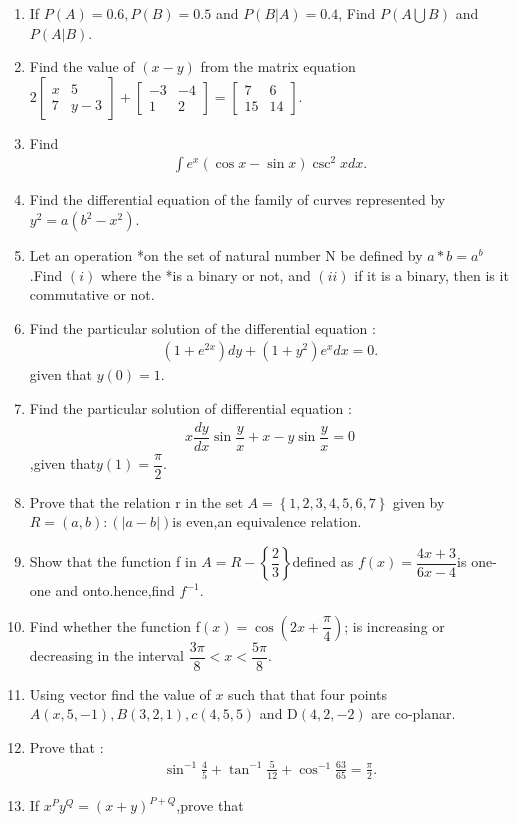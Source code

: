 \documentclass[12pt,-letter paper]{article}
\providecommand{\myvec}[1]{\ensuremath{\begin{bmatrix}#1\end{bmatrix}}}
\providecommand{\cbrak}[1]{\ensuremath{\left\{#1\right\}}}
\providecommand{\brak}[1]{\ensuremath{\left(#1\right)}}
\providecommand{\abs}[1]{\left\vert#1\right\vert}
\begin{document}
\begin{enumerate}
\item If $P\brak{A}=0.6,P\brak{B}=0.5$ and $P\brak{B|A}=0.4$, Find $P\brak{A\bigcup B}$ and $P\brak{A|B}$.
\item Find the value of $\brak{x-y}$ from the matrix equation $2\myvec{x&5\\7&y-3}+\myvec{-3&-4\\1&2}=\myvec{7&6\\15&14}.$
\item Find
\begin{align}
\int e^x\brak{\cos x-\sin x}\csc^2 x dx.
\end{align}
\item Find the differential equation of the family of curves represented by $y^2=a\brak{b^2-x^2}$.
\item Let an operation *on the set of natural number N be defined by $a*b=a^b$.Find $\brak{i}$ where the *is a binary or not, and $\brak{ii}$ if it is a binary, then is it commutative or not.
\item Find the particular solution of the differential equation :
\begin{align*}
    \brak{1+e^{2x}}dy+\brak{1+y^2}e^xdx=0.
\end{align*}given that $y\brak{0}=1$.
\item Find the particular solution of differential equation :
\begin{align*}
    x\dfrac{dy}{dx}\sin \dfrac{y}{x}+x-y\sin \dfrac{y}{x}=0
\end{align*},given that$ y\brak{1}=\dfrac{\pi}{2}$.
\item Prove that the relation r in the set $A=\cbrak{1,2,3,4,5,6,7}$ given by $R=\brak{a,b}:\brak{\abs{a-b} }$is even,an equivalence relation.
\item Show that the function f in $A=R-\cbrak{\dfrac{2}{3}}$defined as $f\brak{x}=\dfrac{4x+3}{6x-4}$is one-one and onto.hence,find $f^{-1}$. 
\item Find whether the function f$\brak{x}=\cos\brak{2x+\dfrac{\pi}{4}}$; is increasing or decreasing in the interval $\dfrac{3\pi}{8}<x<\dfrac{5\pi}{8}.$
\item Using vector find the value of $x$ such that that four points $A\brak{x,5,-1},B\brak{3,2,1},c\brak{4,5,5}$ and D$\brak{4,2,-2}$ are co-planar.
\item Prove that :
\begin{align}
 \sin^{-1 }\frac{4}{5}+\tan^{-1}\frac{5}{12}+\cos^{-1}
\frac{63}{65}=\frac{\pi}{2}.   
\end{align}
\item If $ {x^P}{y^Q}=\brak{x+y}^{P+Q}$,prove that

\end{enumerate}
\end{document}
